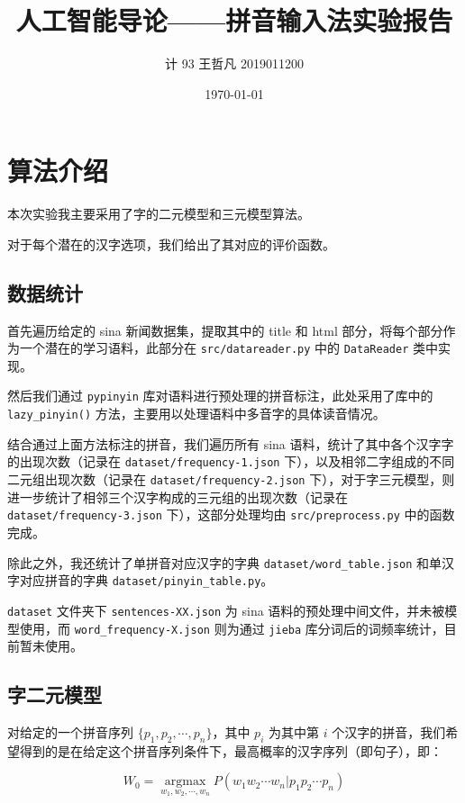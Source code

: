 \documentclass[a4paper]{article}
\title{人工智能导论------拼音输入法实验报告}
\author{计 93 王哲凡 2019011200}
\date{\today}
\begin{document}
    \maketitle
    \tableofcontents

    \newpage
    \section{算法介绍}

    本次实验我主要采用了字的二元模型和三元模型算法。

    对于每个潜在的汉字选项，我们给出了其对应的评价函数。

    \subsection{数据统计}

    首先遍历给定的 sina 新闻数据集，提取其中的 title 和 html 部分，将每个部分作为一个潜在的学习语料，此部分在 \texttt{src/datareader.py} 中的 \texttt{DataReader} 类中实现。 

    然后我们通过 \texttt{pypinyin} 库对语料进行预处理的拼音标注，此处采用了库中的 \texttt{lazy\_pinyin()} 方法，主要用以处理语料中多音字的具体读音情况。

    结合通过上面方法标注的拼音，我们遍历所有 sina 语料，统计了其中各个汉字字的出现次数（记录在 \texttt{dataset/frequency-1.json} 下），以及相邻二字组成的不同二元组出现次数（记录在 \texttt{dataset/frequency-2.json} 下），对于字三元模型，则进一步统计了相邻三个汉字构成的三元组的出现次数（记录在 \texttt{dataset/frequency-3.json} 下），这部分处理均由 \texttt{src/preprocess.py} 中的函数完成。

    除此之外，我还统计了单拼音对应汉字的字典 \texttt{dataset/word\_table.json} 和单汉字对应拼音的字典 \texttt{dataset/pinyin\_table.py}。

    \texttt{dataset} 文件夹下 \texttt{sentences-XX.json} 为 sina 语料的预处理中间文件，并未被模型使用，而 \texttt{word\_frequency-X.json} 则为通过 \texttt{jieba} 库分词后的词频率统计，目前暂未使用。

    \subsection{字二元模型}

    对给定的一个拼音序列 \(\{p_1, p_2, \cdots, p_n\}\)，其中 \(p_i\) 为其中第 \(i\) 个汉字的拼音，我们希望得到的是在给定这个拼音序列条件下，最高概率的汉字序列（即句子），即：

    \[W_0 = \mathop{\arg \max}\limits_{w_1, w_2, \cdots, w_n} P(w_1 w_2 \cdots w_n | p_1 p_2 \cdots p_n)\]
\end{document}
